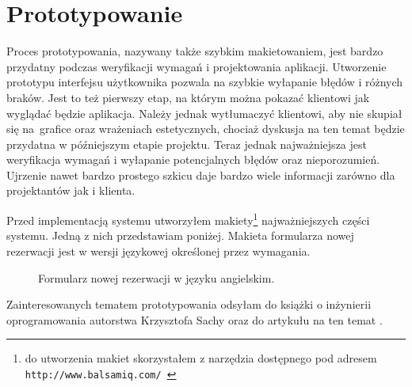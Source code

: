 \documentclass[a4paper,onecolumn,oneside,11pt,wide,floatssmall]{mwrep}
\def\url#1{{ \tt #1}}
\theoremstyle{definition}
\theoremstyle{plain}%
\theoremstyle{remark}
\begin{document}
\section{Prototypowanie}
Proces prototypowania, nazywany także szybkim makietowaniem, jest bardzo przydatny podczas weryfikacji wymagań i 
projektowania aplikacji. Utworzenie prototypu interfejsu użytkownika pozwala na szybkie wyłapanie błędów i różnych 
braków. Jest to też pierwszy etap, na którym można pokazać klientowi jak wyglądać będzie aplikacja. Należy jednak 
wytłumaczyć klientowi, aby nie skupiał się \mbox{na grafice} oraz wrażeniach estetycznych, chociaż dyskusja na ten temat 
będzie przydatna w późniejszym etapie projektu. Teraz jednak najważniejsza jest weryfikacja wymagań i wyłapanie 
potencjalnych błędów oraz nieporozumień. Ujrzenie nawet bardzo prostego szkicu daje bardzo wiele informacji zarówno 
dla projektantów jak i klienta.

Przed implementacją systemu utworzyłem makiety\footnote{do utworzenia makiet skorzystałem z narzędzia dostępnego pod adresem \url{http://www.balsamiq.com/ }} najważniejszych części systemu. Jedną z nich przedstawiam poniżej. Makieta formularza nowej rezerwacji jest w wersji językowej określonej przez wymagania.

\begin{figure}[H]
  \begin{center}
  \end{center}
  \caption{Formularz nowej rezerwacji w języku angielskim.}
  \label{fig:mockup-new-resveration-horizontal}
\end{figure}

Zainteresowanych tematem prototypowania odsyłam do książki o inżynierii oprogramowania autorstwa Krzysztofa Sachy \cite{sacha2010inzynieria} oraz do artykułu na ten temat \cite{wireframes2012infoq}.
\end{document}
